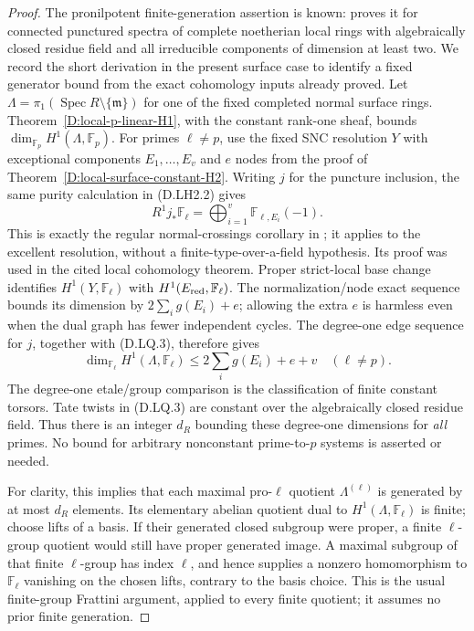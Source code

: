 \begin{proof}
The pronilpotent finite-generation assertion is known:
\citet[Theorem~1.2]{Suzuki2023} proves it for connected punctured
spectra of complete noetherian local rings with algebraically
closed residue field and all irreducible components of dimension
at least two. We record the short derivation in the present
surface case to identify a fixed generator bound from the exact
cohomology inputs already proved. Let
$\Lambda=\pi_1(\operatorname{Spec}R\setminus\{\mathfrak m\})$
for one of the fixed completed normal surface rings.
Theorem~\ref{D:local-p-linear-H1}, with the constant rank-one
sheaf, bounds $\dim_{\mathbb F_p}H^1(\Lambda,\mathbb F_p)$.
For primes $\ell\ne p$, use the fixed SNC resolution $Y$ with
exceptional components $E_1,\ldots,E_v$ and $e$ nodes from the
proof of Theorem~\ref{D:local-surface-constant-H2}.
Writing $j$ for the puncture inclusion, the same purity calculation
in (D.LH2.2) gives
\[
 R^1j_*\mathbb F_\ell
                   =\bigoplus_{i=1}^v\mathbb F_{\ell,E_i}(-1).
                                                               \tag{D.LQ.3}
\]
This is exactly the regular normal-crossings corollary in
\citet[Expos\'e XVI, Theorem~3.1.1 and Corollary~3.1.3,
pp.~242--243]{A_ILO2014}; it applies to the excellent resolution,
without a finite-type-over-a-field hypothesis. Its proof was used
in the cited local cohomology theorem.
Proper strict-local base change identifies
$H^1(Y,\mathbb F_\ell)$ with $H^1(E_{\rm red},\mathbb F_\ell)$.
The normalization/node exact sequence bounds its dimension by
$2\sum_i g(E_i)+e$; allowing the extra $e$ is harmless even when
the dual graph has fewer independent cycles. The degree-one
edge sequence for $j$, together with (D.LQ.3), therefore gives
\[
       \dim_{\mathbb F_\ell}H^1(\Lambda,\mathbb F_\ell)
                  \le 2\sum_i g(E_i)+e+v\quad(\ell\ne p).
                                                               \tag{D.LQ.4}
\]
The degree-one etale/group comparison is the classification of
finite constant torsors. Tate twists in (D.LQ.3) are constant over
the algebraically closed residue field. Thus there is an integer
$d_R$ bounding these degree-one dimensions for \emph{all} primes.
No bound for arbitrary nonconstant prime-to-$p$ systems is asserted
or needed.

For clarity, this implies that each maximal pro-$\ell$ quotient
$\Lambda^{(\ell)}$ is generated by at most $d_R$ elements.
Its elementary abelian quotient dual to
$H^1(\Lambda,\mathbb F_\ell)$ is finite; choose lifts of a basis.
If their generated closed subgroup were proper, a finite
$\ell$-group quotient would still have proper generated image.
A maximal subgroup of that finite $\ell$-group has index $\ell$,
and hence supplies a nonzero homomorphism to $\mathbb F_\ell$
vanishing on the chosen lifts, contrary to the basis choice.
This is the usual finite-group Frattini argument, applied to every
finite quotient; it assumes no prior finite generation.


\end{proof}
